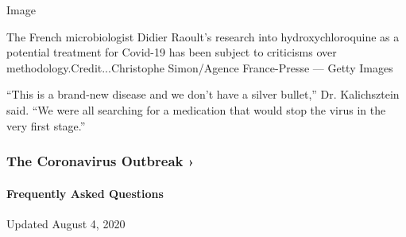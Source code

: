 Image

The French microbiologist Didier Raoult's research into
hydroxychloroquine as a potential treatment for Covid-19 has been
subject to criticisms over methodology.Credit...Christophe Simon/Agence
France-Presse --- Getty Images

``This is a brand-new disease and we don't have a silver bullet,'' Dr.
Kalichsztein said. ``We were all searching for a medication that would
stop the virus in the very first stage.''

\href{https://www.nytimes.com/news-event/coronavirus?action=click\&pgtype=Article\&state=default\&region=MAIN_CONTENT_3\&context=storylines_faq}{}

\hypertarget{the-coronavirus-outbreak-}{%
\subsubsection{The Coronavirus Outbreak
›}\label{the-coronavirus-outbreak-}}

\hypertarget{frequently-asked-questions}{%
\paragraph{Frequently Asked
Questions}\label{frequently-asked-questions}}

Updated August 4, 2020

